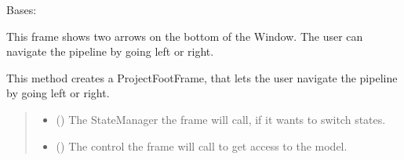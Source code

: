 \documentclass[letterpaper,10pt,english]{sphinxmanual}
\begin{document}
\begin{fulllineitems}
\label{\detokenize{apidoc/src.osm_configurator.view.toplevelframes:src.osm_configurator.view.toplevelframes.project_foot_frame.ProjectFootFrame}}
\pysigstartsignatures
{}
\pysigstopsignatures
\sphinxAtStartPar
Bases: {\hyperref[\detokenize{apidoc/src.osm_configurator.view.toplevelframes:src.osm_configurator.view.toplevelframes.top_level_frame.TopLevelFrame}]{}}

\sphinxAtStartPar
This frame shows two arrows on the bottom of the Window. The user can navigate the pipeline by going left or right.

\begin{fulllineitems}
\label{\detokenize{apidoc/src.osm_configurator.view.toplevelframes:src.osm_configurator.view.toplevelframes.project_foot_frame.ProjectFootFrame.__init__}}
\pysigstartsignatures
{}
\pysigstopsignatures
\sphinxAtStartPar
This method creates a ProjectFootFrame, that lets the user navigate the pipeline by going left or right.
\begin{quote}\begin{description}
\begin{itemize}
\item {} 
\sphinxAtStartPar
{} ({\hyperref[\detokenize{apidoc/src.osm_configurator.view.states:src.osm_configurator.view.states.state_manager.StateManager}]{}}) \textendash{} The StateManager the frame will call, if it wants to switch states.

\item {} 
\sphinxAtStartPar
{} ({\hyperref[\detokenize{apidoc/src.osm_configurator.control:src.osm_configurator.control.control_interface.IControl}]{}}) \textendash{} The control the frame will call to get access to the model.


\end{itemize}
\end{description}
\end{quote}
\end{fulllineitems}
\end{fulllineitems}
\end{document}
